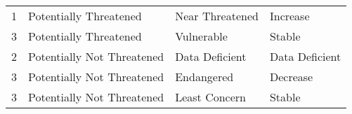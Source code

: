 \begin{table}
{\begin{tabular}{llll}
1                                                              & Potentially Threatened                                                                                                                                   & Near Threatened                                                                                                                                                                                                        & Increase                                                                                                        \\
3                                                              & Potentially Threatened                                                                                                                                   & Vulnerable                                                                                                                                                                                                             & Stable                                                                                                          \\
2                                                              & Potentially Not Threatened                                                                                                                               & Data Deficient                                                                                                                                                                                                         & Data Deficient                                                                                                  \\
3                                                              & Potentially Not Threatened                                                                                                                               & Endangered                                                                                                                                                                                                             & Decrease                                                                                                        \\
3                                                              & Potentially Not Threatened                                                                                                                               & Least Concern                                                                                                                                                                                                          & Stable                                                                                                          \\

\end{tabular}}
\end{table}
